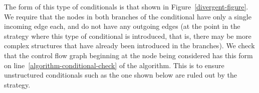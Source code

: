 The form of this type of conditionals is that shown in
Figure~\ref{divergent-figure}.
We require that the nodes in both branches of the conditional have
only a single incoming edge each, and do not have any outgoing edges
(at the point in the strategy where this type of conditional is
introduced, that is, there may be more complex structures that have
already been introduced in the branches).
We check that the control flow graph beginning at the node being
considered has this form on line~\ref{algorithm-conditional-check} of
the algorithm.
This is to ensure unstructured conditionals such as the one shown
below are ruled out by the strategy.
\begin{center}
\end{center}

